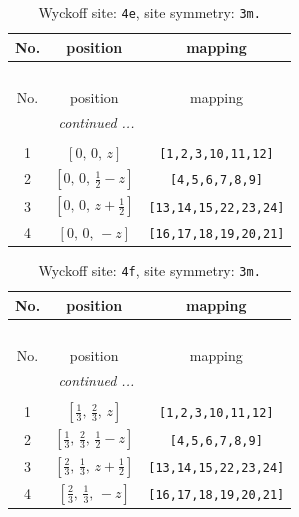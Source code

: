 \documentclass[fleqn,8pt]{jsarticle}
\begin{document}
\begin{longtable}{ccc}
\caption{Wyckoff site: {\tt 4e}, site symmetry: {\tt 3m.}}
 \\
 \hline \hline
No. & position & mapping \\ \hline \endfirsthead

\multicolumn{2}{l}{\tablename\ \thetable{}} \\
 \hline \hline
No. & position & mapping \\ \hline \endhead

 \hline \hline
\multicolumn{2}{r}{\footnotesize\it continued ...} \\ \endfoot

 \hline \hline
\multicolumn{2}{r}{} \\ \endlastfoot

1 & $\left[ 0,\, 0,\, z \right]$ & {\tt [1,2,3,10,11,12]} \\ \hline
2 & $\left[ 0,\, 0,\, \frac{1}{2} - z \right]$ & {\tt [4,5,6,7,8,9]} \\ \hline
3 & $\left[ 0,\, 0,\, z + \frac{1}{2} \right]$ & {\tt [13,14,15,22,23,24]} \\ \hline
4 & $\left[ 0,\, 0,\, - z \right]$ & {\tt [16,17,18,19,20,21]} \\
\end{longtable}
\renewcommand{\arraystretch}{1.2}
\begin{longtable}{ccc}
\caption{Wyckoff site: {\tt 4f}, site symmetry: {\tt 3m.}}
 \\
 \hline \hline
No. & position & mapping \\ \hline \endfirsthead

\multicolumn{2}{l}{\tablename\ \thetable{}} \\
 \hline \hline
No. & position & mapping \\ \hline \endhead

 \hline \hline
\multicolumn{2}{r}{\footnotesize\it continued ...} \\ \endfoot

 \hline \hline
\multicolumn{2}{r}{} \\ \endlastfoot

1 & $\left[ \frac{1}{3},\, \frac{2}{3},\, z \right]$ & {\tt [1,2,3,10,11,12]} \\ \hline
2 & $\left[ \frac{1}{3},\, \frac{2}{3},\, \frac{1}{2} - z \right]$ & {\tt [4,5,6,7,8,9]} \\ \hline
3 & $\left[ \frac{2}{3},\, \frac{1}{3},\, z + \frac{1}{2} \right]$ & {\tt [13,14,15,22,23,24]} \\ \hline
4 & $\left[ \frac{2}{3},\, \frac{1}{3},\, - z \right]$ & {\tt [16,17,18,19,20,21]} \\
\end{longtable}
\end{document}
